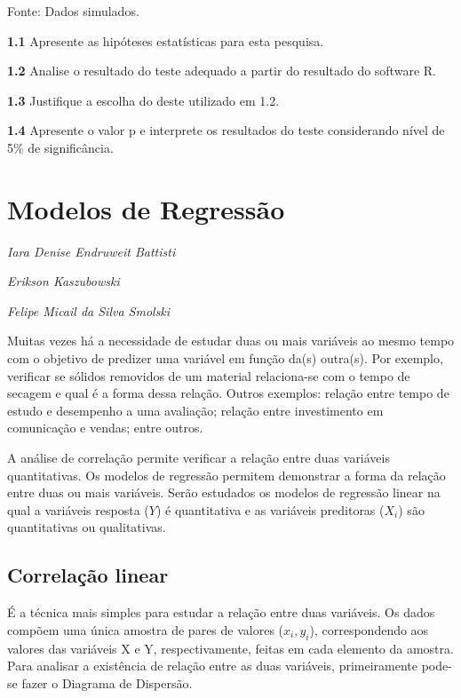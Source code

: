 \documentclass[12pt,brazil,oneside]{book}
\begin{document}
Fonte: Dados simulados.

\textbf{1.1} Apresente as hipóteses estatísticas para esta pesquisa.

\textbf{1.2} Analise o resultado do teste adequado a partir do resultado do software R.

\textbf{1.3} Justifique a escolha do deste utilizado em 1.2.

\textbf{1.4} Apresente o valor p e interprete os resultados do teste considerando nível de 5\% de significância.

\hypertarget{reg}{%
\chapter{Modelos de Regressão}\label{reg}}

\emph{Iara Denise Endruweit Battisti}

\emph{Erikson Kaszubowski}

\emph{Felipe Micail da Silva Smolski}

\begin{flushright}
\emph{}
\end{flushright}

Muitas vezes há a necessidade de estudar duas ou mais variáveis ao mesmo tempo com o objetivo de predizer uma variável em função da(s) outra(s). Por exemplo, verificar se sólidos removidos de um material relaciona-se com o tempo de secagem e qual é a forma dessa relação. Outros exemplos: relação entre tempo de estudo e desempenho a uma avaliação; relação entre investimento em comunicação e vendas; entre outros.

A análise de correlação permite verificar a relação entre duas variáveis quantitativas. Os modelos de regressão permitem demonstrar a forma da relação entre duas ou mais variáveis. Serão estudados os modelos de regressão linear na qual a variáveis resposta (\(Y\)) é quantitativa e as variáveis preditoras (\(X_i\)) são quantitativas ou qualitativas.

\hypertarget{correlacao-linear}{%
\section{Correlação linear}\label{correlacao-linear}}

É a técnica mais simples para estudar a relação entre duas variáveis. Os dados compõem uma única amostra de pares de valores (\(x_i, y_i\)), correspondendo aos valores das variáveis X e Y, respectivamente, feitas em cada elemento da amostra. Para analisar a existência de relação entre as duas variáveis, primeiramente pode-se fazer o Diagrama de Dispersão.
\end{document}

